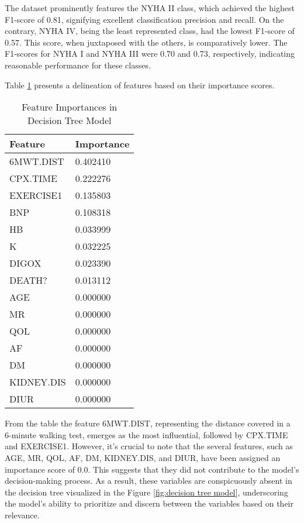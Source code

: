 The dataset prominently features the NYHA II class, which achieved the highest F1-score of 0.81, signifying excellent classification precision and recall. On the contrary, NYHA IV, being the least represented class, had the lowest F1-score of 0.57. This score, when juxtaposed with the others, is comparatively lower. The F1-scores for NYHA I and NYHA III were 0.70 and 0.73, respectively, indicating reasonable performance for these classes.

Table \ref{tab:decision_tree_feature_importance} presents a delineation of features based on their importance scores.

\begin{table}[H]
  \centering
  \caption{Feature Importances in Decision Tree Model}
  \label{tab:decision_tree_feature_importance}
  \begin{tabular}{|p{3cm}|p{2.5cm}|}
  \hline
  \textbf{Feature} & \textbf{Importance} \\ \hline
  6MWT.DIST & 0.402410 \\
  CPX.TIME & 0.222276 \\
  EXERCISE1 & 0.135803 \\
  BNP & 0.108318 \\
  HB & 0.033999 \\
  K & 0.032225 \\
  DIGOX & 0.023390 \\
  DEATH? & 0.013112 \\
  AGE & 0.000000 \\
  MR & 0.000000 \\
  QOL & 0.000000 \\
  AF & 0.000000 \\
  DM & 0.000000 \\
  KIDNEY.DIS & 0.000000 \\
  DIUR & 0.000000 \\ \hline
  \end{tabular}
\end{table}

From the table the feature 6MWT.DIST, representing the distance covered in a 6-minute walking test, emerges  as the most influential, followed by CPX.TIME and EXERCISE1. However, it's crucial to note that the several features, such as AGE, MR, QOL, AF, DM, KIDNEY.DIS, and DIUR, have been assigned an importance score of 0.0. This suggests that they did not contribute to the model's decision-making process. As a result, these variables are conspicuously absent in the decision tree visualized in the Figure \ref{fig:decision tree model}, underscoring the model's ability to prioritize and discern between the variables based on their relevance.

